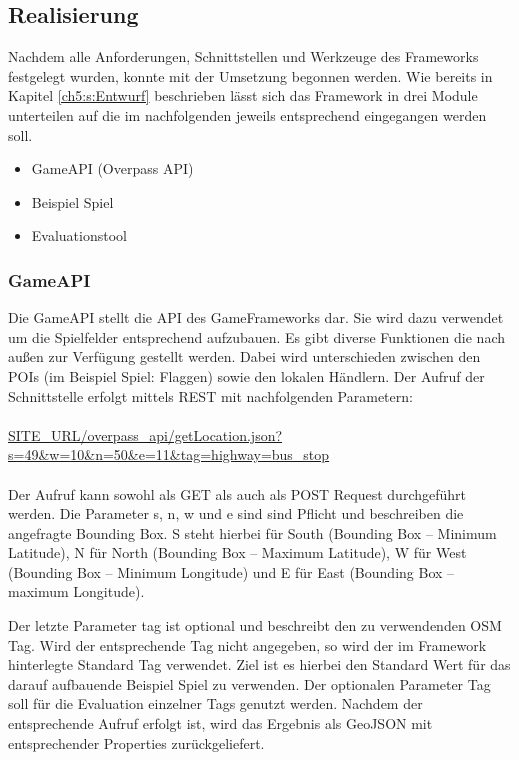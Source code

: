 \subsection*{Realisierung}

Nachdem alle Anforderungen, Schnittstellen und Werkzeuge des Frameworks festgelegt wurden, konnte mit der Umsetzung begonnen werden.
Wie bereits in Kapitel \ref{ch5:s:Entwurf} beschrieben lässt sich das Framework in drei Module unterteilen auf die im nachfolgenden jeweils entsprechend eingegangen werden soll.

\begin{itemize}

\item GameAPI (Overpass API)
\item Beispiel Spiel
\item Evaluationstool

\end{itemize}

\subsubsection*{GameAPI}

Die GameAPI stellt die API des GameFrameworks dar. Sie wird dazu verwendet um die Spielfelder entsprechend aufzubauen.
Es gibt diverse Funktionen die nach außen zur Verfügung gestellt werden.
Dabei wird unterschieden zwischen den POIs (im Beispiel Spiel: Flaggen) sowie den lokalen Händlern.
Der Aufruf der Schnittstelle erfolgt mittels REST mit nachfolgenden Parametern:
\\\\
\url{SITE\_URL/overpass\_api/getLocation.json?s=49&w=10&n=50&e=11&tag=highway=bus\_stop}
\\\\
Der Aufruf kann sowohl als GET als auch als POST Request durchgeführt werden. Die Parameter s, n, w und e sind sind Pflicht und beschreiben die angefragte Bounding Box.
S steht hierbei für South (Bounding Box -- Minimum Latitude), N für North (Bounding Box -- Maximum Latitude), W für West (Bounding Box -- Minimum Longitude) und E für East (Bounding Box -- maximum Longitude).

Der letzte Parameter tag ist optional und beschreibt den zu verwendenden OSM Tag. Wird der entsprechende Tag nicht angegeben, so wird der im Framework hinterlegte Standard Tag verwendet. Ziel ist es hierbei den Standard Wert für das darauf aufbauende Beispiel Spiel zu verwenden. Der optionalen Parameter Tag soll für die Evaluation einzelner Tags genutzt werden. Nachdem der entsprechende Aufruf erfolgt ist, wird das Ergebnis als GeoJSON mit entsprechender Properties zurückgeliefert.
\\\\ %

